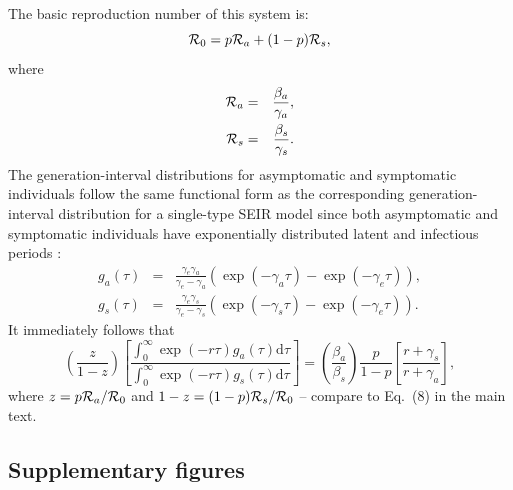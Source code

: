 The basic reproduction number of this system is:
\begin{equation}
{\cal{R}}_{0}= p {\cal{R}}_a + (1-p) {\cal{R}}_s,
\end{equation}
where 
\begin{eqnarray}
{\cal{R}}_a &=& \frac{\beta_a}{\gamma_a},\\
{\cal{R}}_s &=& \frac{\beta_s}{\gamma_s}.
\end{eqnarray}
The generation-interval distributions for asymptomatic and symptomatic individuals follow the same functional form as the corresponding generation-interval distribution for a single-type SEIR model since both asymptomatic and symptomatic individuals have exponentially distributed latent and infectious periods \citep{svensson2015influence}:
\begin{eqnarray}
g_a(\tau) &=& \frac{\gamma_e \gamma_a}{\gamma_e - \gamma_a} \left(\exp(-\gamma_a \tau) - \exp(-\gamma_e \tau)\right),\\
g_s(\tau) &=& \frac{\gamma_e \gamma_s}{\gamma_e - \gamma_s} \left(\exp(-\gamma_s \tau) - \exp(-\gamma_e \tau)\right).
\end{eqnarray}
It immediately follows that 
\begin{equation}
\left(\frac{z}{1-z}\right)\left[\frac{\int_0^\infty \exp(-r\tau) g_a(\tau) \mathrm{d}\tau}{\int_0^\infty \exp(-r\tau) g_s(\tau) \mathrm{d}\tau}\right] = \left(\frac{\beta_a}{\beta_s}\right)\frac{p}{1-p}\left[\frac{r+\gamma_s}{r+\gamma_a}\right],
\end{equation}
where $z = p {\cal{R}}_a/{\cal{R}}_{0}$ and $1-z=(1-p) {\cal{R}}_s/{\cal{R}}_{0}$ -- compare to Eq.~(8) in the main text.

\pagebreak

\subsection*{Supplementary figures}

